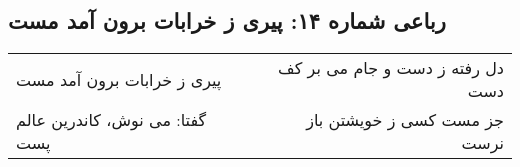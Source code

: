\begin{center}
\section*{رباعی شماره ۱۴: پیری ز خرابات برون آمد مست}
\label{sec:014}
\begin{longtable}{l p{0.5cm} r}
پیری ز خرابات برون آمد مست
&&
دل رفته ز دست و جام می بر کف دست
\\
گفتا: می نوش، کاندرین عالم پست
&&
جز مست کسی ز خویشتن باز نرست
\\
\end{longtable}
\end{center}
